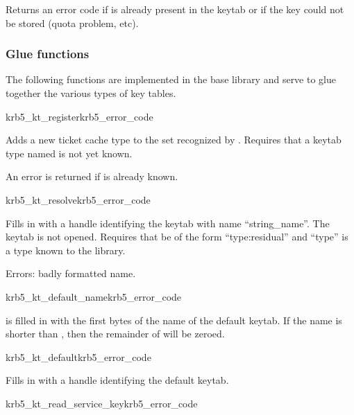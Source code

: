 Returns an error code if  is already present in the
keytab or if the key could not be stored (quota problem, etc).


\subsubsection{Glue functions}
The following functions are implemented in the base library and serve to
glue together the various types of key tables.

\begin{funcdecl}{krb5_kt_register}{krb5_error_code}{\funcin}
\end{funcdecl}


Adds a new ticket cache type to the set recognized by
.
Requires that a keytab type named  is not
yet known.

An error is returned if  is already known.

\begin{funcdecl}{krb5_kt_resolve}{krb5_error_code}{\funcin}
\funcout
{}
\end{funcdecl}

Fills in  with a handle identifying the keytab with name
``string_name''.  The keytab is not opened.
Requires that  be of the form ``type:residual'' and
``type'' is a type known to the library.

Errors: badly formatted name.
		
\begin{funcdecl}{krb5_kt_default_name}{krb5_error_code}{\funcin}
\end{funcdecl}

 is filled in with the first  bytes of
the name of the default keytab.
If the name is shorter than , then the remainder of
 will be zeroed.


\begin{funcdecl}{krb5_kt_default}{krb5_error_code}{\funcin}
\end{funcdecl}

Fills in  with  a handle identifying the default keytab.

\begin{funcdecl}{krb5_kt_read_service_key}{krb5_error_code}{\funcin}
\funcout
{}
\end{funcdecl}

